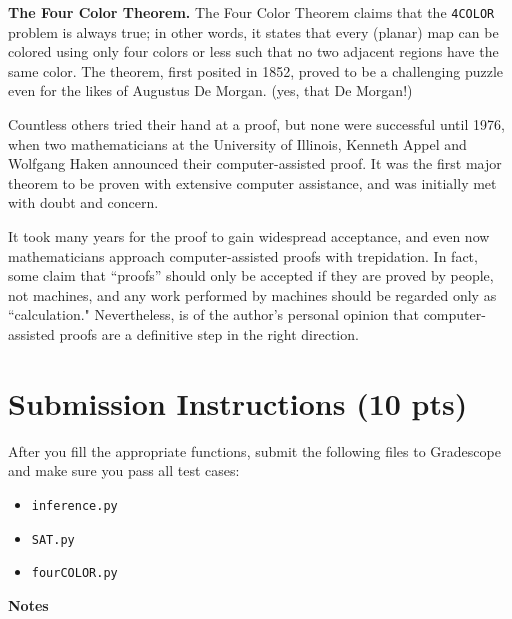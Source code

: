 \documentclass{article}
\begin{document}
    \begin{tcolorbox}[colback=green!10, phantom=\phantomsection\hypertarget{fct}]

        \textbf{The Four Color Theorem.}
        The Four Color Theorem claims that the \lstinline{4COLOR} problem is always true; in other words, it states that every (planar) map can be colored using only four colors or less such that no two adjacent regions have the same color. The theorem, first posited in 1852, proved to be a challenging puzzle even for the likes of Augustus De Morgan. (yes, that De Morgan!)

        \vspace{3mm}
        Countless others tried their hand at a proof, but none were successful until 1976, when two mathematicians at the University of Illinois, Kenneth Appel and Wolfgang Haken announced their computer-assisted proof.  It was the first major theorem to be proven with extensive computer assistance, and was initially met with doubt and concern.

        \vspace{3mm}
        It took many years for the proof to gain widespread acceptance, and even now mathematicians approach computer-assisted proofs with trepidation. In fact, some claim that ``proofs” should only be accepted if they are proved by people, not machines, and any work performed by machines should be regarded only as ``calculation." Nevertheless, is of the author's personal opinion that computer-assisted proofs are a definitive step in the right direction.
    \end{tcolorbox}

\section*{Submission Instructions (10 pts)}
    After you fill the appropriate functions, submit the following files to Gradescope and make sure you pass all test cases:
    \begin{itemize}
        \item \lstinline{inference.py}
        \item \lstinline{SAT.py}
        \item \lstinline{fourCOLOR.py}
    \end{itemize}

    \vspace{3mm}
    \textbf{Notes}
\end{document}
